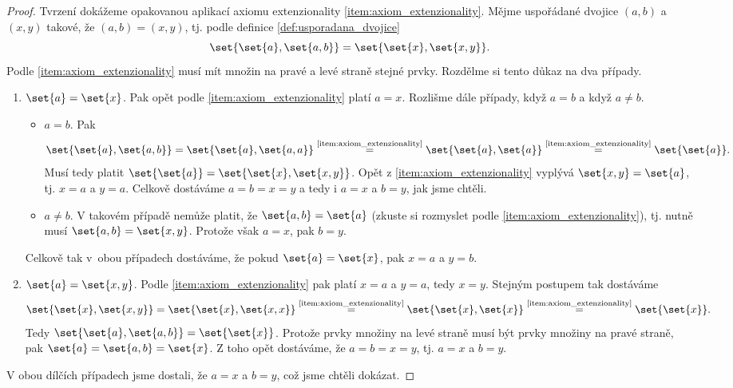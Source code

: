 \begin{proof}
    Tvrzení dokážeme opakovanou aplikací axiomu extenzionality \ref{item:axiom_extenzionality}. Mějme uspořádané dvojice $(a,b)$ a $(x,y)$ takové, že $(a,b)=(x,y)$, tj. podle definice \ref{def:usporadana_dvojice}
    \begin{equation*}
        \set{\set{a},\set{a,b}}=\set{\set{x},\set{x,y}}.
    \end{equation*}
    Podle \ref{item:axiom_extenzionality} musí mít množin na pravé a levé straně stejné prvky. Rozdělme si tento důkaz na dva případy.
    \begin{enumerate}[label=(\alph*)]
        \item $\set{a}=\set{x}$. Pak opět podle \ref{item:axiom_extenzionality} platí $a=x$. Rozlišme dále případy, když $a=b$ a když $a\neq b$.
        \begin{itemize}
            \item $a=b$. Pak
            \begin{equation*}
                \set{\set{a},\set{a,b}}=\set{\set{a},\set{a,a}}\stackrel{\text{\ref{item:axiom_extenzionality}}}{=}\set{\set{a},\set{a}}\stackrel{\text{\ref{item:axiom_extenzionality}}}{=}\set{\set{a}}.
            \end{equation*}
            Musí tedy platit $\set{\set{a}}=\set{\set{x},\set{x,y}}$. Opět z \ref{item:axiom_extenzionality} vyplývá $\set{x,y}=\set{a}$, tj. $x=a$ a $y=a$. Celkově dostáváme $a=b=x=y$ a tedy i $a=x$ a $b=y$, jak jsme chtěli.
            \item $a\neq b$. V takovém případě nemůže platit, že $\set{a,b}=\set{a}$ (zkuste si rozmyslet podle \ref{item:axiom_extenzionality}), tj. nutně musí $\set{a,b}=\set{x,y}$. Protože však $a=x$, pak $b=y$.
        \end{itemize}
        Celkově tak v~obou případech dostáváme, že pokud $\set{a}=\set{x}$, pak $x=a$ a $y=b$.
        \item $\set{a}=\set{x,y}$. Podle \ref{item:axiom_extenzionality} pak platí $x=a$ a $y=a$, tedy $x=y$. Stejným postupem tak dostáváme
        \begin{equation*}
            \set{\set{x},\set{x,y}}=\set{\set{x},\set{x,x}}\stackrel{\text{\ref{item:axiom_extenzionality}}}{=}\set{\set{x},\set{x}}\stackrel{\text{\ref{item:axiom_extenzionality}}}{=}\set{\set{x}}.
        \end{equation*}
        Tedy $\set{\set{a},\set{a,b}}=\set{\set{x}}$. Protože prvky množiny na levé straně musí být prvky množiny na pravé straně, pak $\set{a}=\set{a,b}=\set{x}$. Z toho opět dostáváme, že $a=b=x=y$, tj. $a=x$ a $b=y$.
    \end{enumerate}
    V obou dílčích případech jsme dostali, že $a=x$ a $b=y$, což jsme chtěli dokázat.
\end{proof}